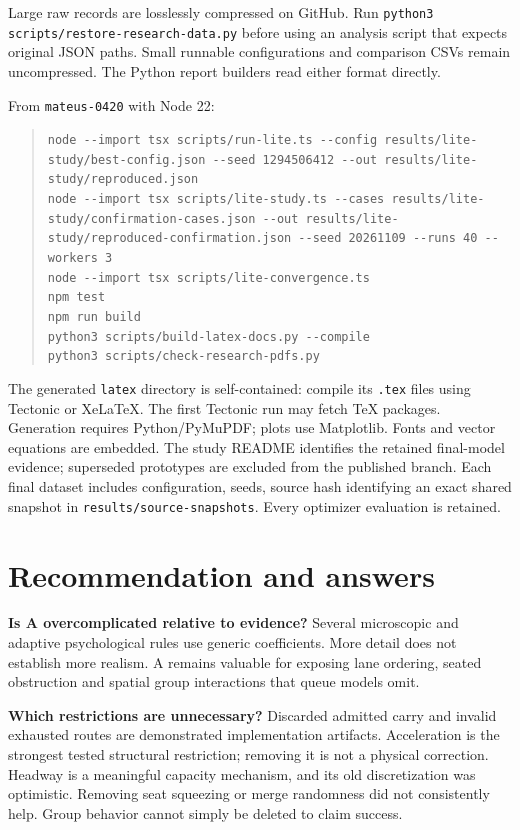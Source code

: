 \documentclass[11pt,a4paper]{article}
\newcommand{\code}[1]{{\small\nolinkurl{#1}}}
\begin{document}
Large raw records are losslessly compressed on GitHub. Run \code{python3 scripts/restore-research-data.py} before using an analysis script that expects original JSON paths. Small runnable configurations and comparison CSVs remain uncompressed. The Python report builders read either format directly.


From \code{mateus-0420} with Node 22:


\begin{quote}\small\ttfamily
\nolinkurl{node --import tsx scripts/run-lite.ts --config results/lite-study/best-config.json --seed 1294506412 --out results/lite-study/reproduced.json}\\\nolinkurl{node --import tsx scripts/lite-study.ts --cases results/lite-study/confirmation-cases.json --out results/lite-study/reproduced-confirmation.json --seed 20261109 --runs 40 --workers 3}\\\nolinkurl{node --import tsx scripts/lite-convergence.ts}\\\nolinkurl{npm test}\\\nolinkurl{npm run build}\\\nolinkurl{python3 scripts/build-latex-docs.py --compile}\\\nolinkurl{python3 scripts/check-research-pdfs.py}\end{quote}

The generated \code{latex} directory is self-contained: compile its \code{.tex} files using Tectonic or XeLaTeX. The first Tectonic run may fetch TeX packages. Generation requires Python/PyMuPDF; plots use Matplotlib. Fonts and vector equations are embedded. The study README identifies the retained final-model evidence; superseded prototypes are excluded from the published branch. Each final dataset includes configuration, seeds, source hash identifying an exact shared snapshot in \code{results/source-snapshots}. Every optimizer evaluation is retained.


\section{Recommendation and answers}

\textbf{Is A overcomplicated relative to evidence?} Several microscopic and adaptive psychological rules use generic coefficients. More detail does not establish more realism. A remains valuable for exposing lane ordering, seated obstruction and spatial group interactions that queue models omit.


\textbf{Which restrictions are unnecessary?} Discarded admitted carry and invalid exhausted routes are demonstrated implementation artifacts. Acceleration is the strongest tested structural restriction; removing it is not a physical correction. Headway is a meaningful capacity mechanism, and its old discretization was optimistic. Removing seat squeezing or merge randomness did not consistently help. Group behavior cannot simply be deleted to claim success.
\end{document}
